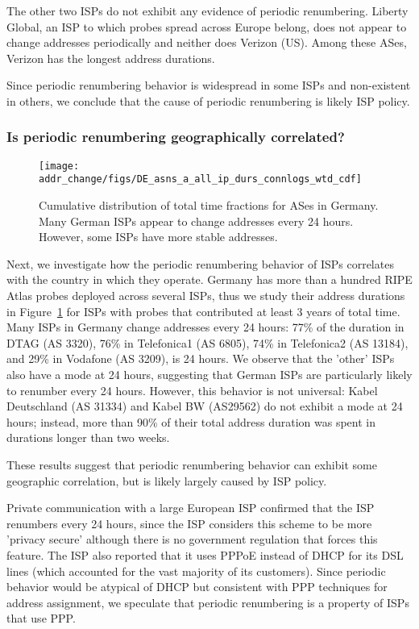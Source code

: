 The other two ISPs do not exhibit any evidence of periodic
renumbering. Liberty Global, an ISP to which probes spread
across Europe belong, does not appear to change addresses periodically
and neither does Verizon (US). Among these ASes, Verizon
has the longest address durations.

Since periodic renumbering behavior is widespread in some ISPs and
non-existent in others, we conclude that the cause of periodic renumbering is likely ISP
policy. 

\subsubsection{Is periodic renumbering geographically correlated?}
\label{sec:germany}

\begin{figure}[tb]
  \begin{center}
    \texttt{[image: addr\_change/figs/DE\_asns\_a\_all\_ip\_durs\_connlogs\_wtd\_cdf]}
  \end{center}
  \caption{\label{fig:DE_asns_all_durs}
    Cumulative distribution of total time fractions for ASes in Germany.
        Many
      German ISPs appear to change addresses every 24 hours. However,
      some ISPs have more stable addresses.
  }
\end{figure}


Next, we investigate how the periodic renumbering behavior of ISPs
correlates with the country in which they operate. 
Germany has more than a hundred RIPE Atlas probes deployed across
several ISPs, thus we study their
address durations in Figure~\ref{fig:DE_asns_all_durs} for ISPs
with probes that contributed at least 3 years of total time. 
Many ISPs in Germany change addresses every 24 hours: 77\% of the duration in DTAG
(AS 3320), 76\% in Telefonica1 (AS 6805), 74\% in Telefonica2 (AS
13184), and 29\% in Vodafone (AS 3209), is 24 hours. We observe
that the 'other' ISPs also have a mode at 24 hours, suggesting that
German ISPs are particularly likely to renumber every 24
hours. However, this behavior is not universal: Kabel
Deutschland (AS 31334) and
Kabel BW (AS29562) do not exhibit a mode at 24 hours; instead, more than 90\% of their
total address duration was spent in durations longer than two weeks. 

These results suggest that periodic renumbering behavior can exhibit
some geographic correlation, but is likely
largely caused by ISP policy. 

Private communication with a large European ISP confirmed that the ISP renumbers every 24
hours, since the ISP considers this scheme to be more 'privacy secure' although
there is no government regulation that forces this feature. The ISP
also reported that it uses PPPoE instead of DHCP for its DSL
lines (which accounted for the vast majority of its customers). Since
periodic behavior would be atypical of DHCP but consistent with PPP
techniques for address assignment, we speculate that periodic
renumbering is a property of ISPs that use PPP.

